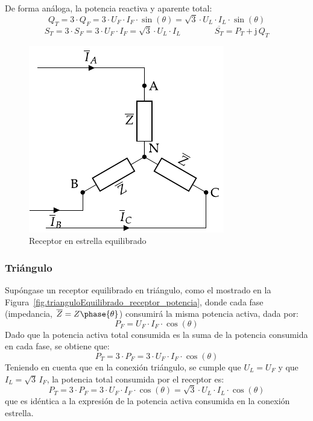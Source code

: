 \documentclass[11pt]{book} %
\begin{document}
	
	De forma análoga, la potencia reactiva y aparente total:
	\begin{equation}
	    \boxed{Q_T=3\cdot Q_F=3\cdot U_F\cdot {I_F}\cdot\sin(\theta)=\sqrt{3}\cdot U_L\cdot I_L\cdot\sin(\theta)}
	\end{equation}
	\begin{equation}
	    \boxed{S_T=3\cdot S_F=3\cdot U_F\cdot {I_F}=\sqrt{3}\cdot U_L\cdot I_L}\qquad\qquad \boxed{\overline{S_T}=P_T+\mathrm{j}\,Q_T}
	\end{equation}
	
	\begin{figure}
	    \centering
	    \includegraphics{../figs/EstrellaEquilibrado_Receptor_SN.pdf}
	    \caption{Receptor en estrella equilibrado}
	    \label{fig.estrellaequilibrado_SN_potencia}
	\end{figure}
	
	\subsubsection{Triángulo}
	
	Supóngase un receptor equilibrado en triángulo, como el mostrado en la Figura~\ref{fig.trianguloEquilibrado_receptor_potencia}, donde cada fase (impedancia, $\overline{Z}=Z\phase{\theta}$) consumirá la misma potencia activa, dada por: 
	\begin{equation*}
	    P_F=U_{F}\cdot I_F \cdot \cos(\theta)
	\end{equation*}
	Dado que la potencia activa total consumida es la suma de la potencia consumida en cada fase, se obtiene que:
	\begin{equation*}
	    P_T=3\cdot P_F=3\cdot U_F\cdot I_F\cdot\cos(\theta)
	\end{equation*}
	Teniendo en cuenta que en la conexión triángulo, se cumple que $U_L=U_F$ y que $I_L=\sqrt{3}\,I_F$, la potencia total consumida por el receptor es: 
	\begin{equation}
	    \boxed{P_T=3\cdot P_F=3\cdot U_F\cdot {I_F}\cdot\cos(\theta)=\sqrt{3}\cdot U_L\cdot I_L\cdot\cos(\theta)}
	\end{equation}
	que es idéntica a la expresión de la potencia activa consumida en la conexión estrella.
	
\end{document}
